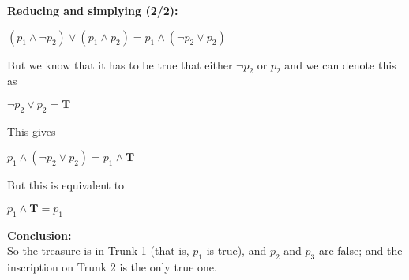 \begin{tcolorbox}[title=Example 1: King's Daughter Treasure Logic Puzzle (2/2)]
\textbf{Reducing and simplying (2/2):}  
\begin{center}
$\left(p_1 \land \neg p_2  \right) \lor \left(p_1 \land  p_2\right) = p_1 \land (\neg p_2 \lor p_2) $    
\end{center}
But we know that it has to be true that either $\neg p_2$ or $p_2$ and we can denote this as
\begin{center}
$\neg p_2 \lor p_2 = \mathbf{T}$   
\end{center}
This gives
\begin{center}
$p_1 \land (\neg p_2 \lor p_2) = p_1 \land \mathbf{T}$ 
\end{center}
But this is equivalent to
\begin{center}
$ p_1 \land \mathbf{T} = p_1$ 
\end{center}
\textbf{Conclusion:} \\
So the treasure is in Trunk 1 (that is, $p_1$ is true), and $p_2$ and $p_3$ are false; and the inscription on Trunk 2 is the only true one.
\end{tcolorbox}

